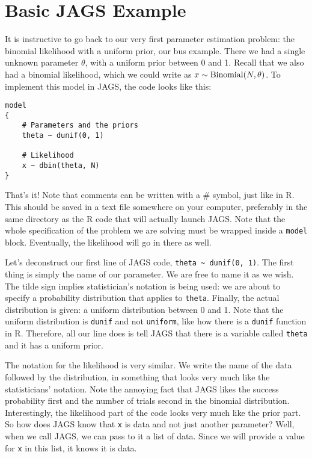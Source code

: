 \section{Basic JAGS Example}
It is instructive to go back to our very first parameter estimation problem:
the binomial likelihood with a uniform prior, our bus example. There we had a
single unknown parameter $\theta$, with a uniform prior between 0 and 1.
Recall that we also had a binomial likelihood, which we could write as
$x \sim \textnormal{Binomial}(N, \theta)$.
To implement this model in JAGS, the code looks like this:
\begin{framed}
\begin{verbatim}
model
{
    # Parameters and the priors
    theta ~ dunif(0, 1)

    # Likelihood
    x ~ dbin(theta, N)
}
\end{verbatim}
\end{framed}
That's it! Note that comments can be written with a \# symbol, just like in R.
This should be saved in a text file somewhere on your computer, preferably in
the same directory as the R code that will actually launch JAGS. Note that
the whole specification of the problem we are solving must be wrapped inside
a {\tt model {   }} block. Eventually, the likelihood will go in there as well.

Let's deconstruct our first line of JAGS code, {\tt theta \~{ } dunif(0, 1)}. The
first thing is simply the name of our parameter. We are free to name it as we
wish. The tilde sign implies statistician's notation is being used: we are
about to specify a probability distribution that applies to {\tt theta}. Finally,
the actual distribution is given: a uniform distribution between 0 and 1. Note
that the uniform distribution is {\tt dunif} and not {\tt uniform}, like how
there is a {\tt dunif} function in R. Therefore, all our line does is tell JAGS
that there is a variable called {\tt theta} and it has a uniform prior.

The notation for the likelihood is very similar. We write the name of the data
followed by the distribution, in something that looks very much like the
statisticians' notation. Note the annoying fact that JAGS likes the success
probability first and the number of trials second in the binomial distribution.
Interestingly, the likelihood part of the code looks very much like the
prior part. So how does JAGS know that {\tt x} is data and not just another
parameter? Well, when we call JAGS, we can pass to it a list of data. Since we
will provide a value for {\tt x} in this list, it knows it is data.


